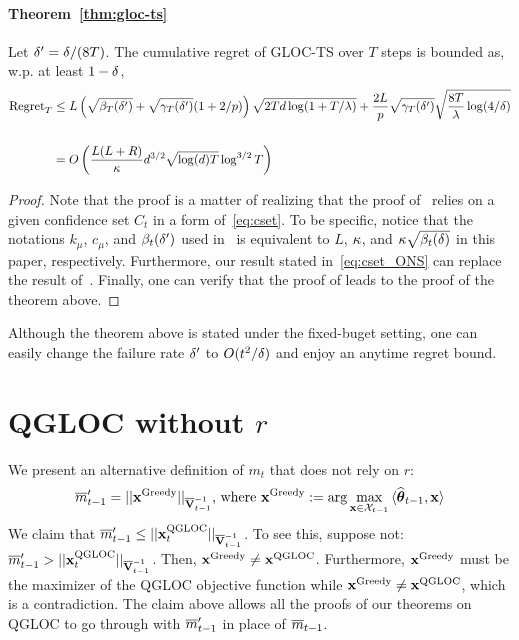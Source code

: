 \paragraph{Theorem~\ref{thm:gloc-ts}}
Let ${\delta}' = {\delta}/(8T)$.
The cumulative regret of GLOC-TS over $T$ steps is bounded as, w.p. at least $1-{\delta}$,
\begin{equation*}\begin{aligned}
    \text{Regret}_T &\le L\left(\sqrt{\beta_T({\delta}')} + \sqrt{{\gamma}_T({\delta}')}(1+2/p)\right)\sqrt{2Td\log(1+T/{\lambda})} + { \frac{2L}{p} } \sqrt{{\gamma}_T({\delta}')} \sqrt{{ \frac{8T}{{\lambda}} }\log(4/{\delta})} \\
  \\&= O\left({ \frac{L(L + R)}{{\kappa}} } d^{3/2} \sqrt{\log(d) T} \log^{3/2} T \right)
\end{aligned}\end{equation*}
\begin{proof}
  Note that the proof is a matter of realizing that the proof of~\citet[Lemma 4]{abeille17linear} relies on a given confidence set $C_t$ in a form of~\eqref{eq:cset}.
  To be specific, notice that the notations $k_\mu$, $c_\mu$, and $\beta_t({\delta}')$ used in~\citet{abeille17linear} is equivalent to $L$, ${\kappa}$, and ${\kappa}\sqrt{\beta_t({\delta})}$ in this paper, respectively.
  Furthermore, our result stated in~\eqref{eq:cset_ONS} can replace the result of~\citet[Prop. 11]{abeille17linear}.
  Finally, one can verify that the proof of \citet[Lemma 4]{abeille17linear} leads to the proof of the theorem above.
\end{proof}
Although the theorem above is stated under the fixed-buget setting, one can easily change the failure rate ${\delta}'$ to $O(t^2/{\delta})$ and enjoy an anytime regret bound.

\vspace{-5pt}
\section{QGLOC without \texorpdfstring{$r$}{}}
\vspace{-5pt}

We present an alternative definition of $m_t$ that does not rely on $r$: %
\begin{align*}
  \overline{m}'_{t-1} = ||\mathbf{x}^{\text{Greedy}}||_{\overline{\mathbf{V}}^{-1}_{t-1}} \text{, where } \mathbf{x}^{\text{Greedy}} := \arg \max_{\mathbf{x}\in\mathcal{X}_{t-1}} {\langle} \widehat{\boldsymbol\theta}_{t-1}, \mathbf{x} {\rangle} 
\end{align*}
We claim that $\overline{m}'_{t-1} \le ||\mathbf{x}_t^{{\text{\normalfont QGLOC}}}||_{\overline{\mathbf{V}}^{-1}_{t-1}}$.
To see this, suppose not: $\overline{m}'_{t-1} > ||\mathbf{x}_t^{{\text{\normalfont QGLOC}}}||_{\overline{\mathbf{V}}^{-1}_{t-1}}$.
Then, $\mathbf{x}^{\text{Greedy}} \neq \mathbf{x}^{{\text{\normalfont QGLOC}}}$.
Furthermore, $\mathbf{x}^{\text{Greedy}}$ must be the maximizer of the QGLOC objective function while $\mathbf{x}^{\text{Greedy}} \neq \mathbf{x}^{{\text{\normalfont QGLOC}}}$, which is a contradiction.  
The claim above allows all the proofs of our theorems on QGLOC to go through with $\overline{m}'_{t-1}$ in place of $\overline{m}_{t-1}$.

